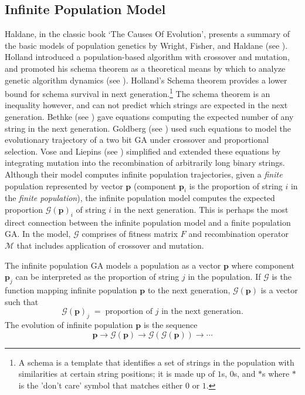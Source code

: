 \subsection{Infinite Population Model}
Haldane, in the classic book `The Causes Of Evolution', presents a summary of the basic models of population genetics 
by Wright, Fisher, and Haldane (see \cite{Haldane1932}). 
Holland introduced a population-based algorithm with crossover and mutation, 
and promoted his schema theorem as a theoretical means by which to analyze genetic algorithm dynamics (see \cite{Holland1975}). 
Holland's Schema theorem provides a lower bound for schema survival in 
next generation.\footnote{A schema is a template that identifies a set of strings in the population with similarities 
at certain string positions; it is made up of $1$s, $0$s, and $\ast$s where 
$\ast$ is the 'don't care' symbol that matches either $0$ or $1$.} The schema theorem is an inequality however, 
and can not predict which strings are expected in the next generation. 
Bethke (see \cite{Bethke1981}) gave equations computing the expected number of any string in the next generation. 
Goldberg (see \cite{Goldberg1987}) used such equations 
to model the evolutionary trajectory of a two bit GA under crossover 
and proportional selection. Vose and Liepins (see \cite{VoseLiepins1991}) simplified and extended 
these equations by integrating mutation into the recombination of arbitrarily long binary strings. 
Although their model computes infinite population trajectories, given a {\em finite} population represented by vector $\bm{p}$  
(component $\bm{p}_i$ is the proportion of string $i$ in the {\em finite population}), the infinite population model 
computes the expected proportion $\mathcal{G}(\bm{p})_i$ of string $i$ in the next generation.  This is perhaps the most 
direct connection between the infinite population model and a finite population GA. In the model, $\mathcal{G}$ 
comprises of fitness matrix $F$ and recombination operator $\mathcal{M}$ that includes application of crossover and mutation.

The infinite population GA models a population as a vector $\bm{p}$ where component $\bm{p}_j$ 
can be interpreted as the proportion of string $j$ in the population. If $\mathcal{G}$ is the function mapping infinite population $\bm{p}$ to 
the next generation, $\mathcal{G}(\bm{p})$ is a vector such that 
\[
\mathcal{G}(\bm{p})_j \; = \; \text{proportion of $j$ in the next generation}.
\]
The evolution of infinite population $\bm{p}$ is the sequence
\[ \bm{p} \to \mathcal{G}(\bm{p}) \to  {\mathcal{G}}(\mathcal{G}(\bm{p})) \to \cdots \]
\setcounter{footnote}{2}

